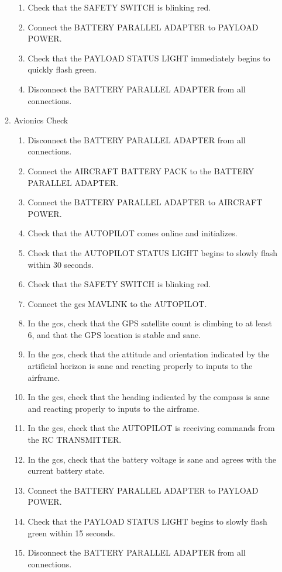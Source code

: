 \documentclass{report}
\begin{document}
\begin{enumerate}
\begin{enumerate}
\begin{enumerate}
							\item Check that the SAFETY SWITCH is blinking red.
							\item Connect the BATTERY PARALLEL ADAPTER to PAYLOAD POWER.
							\item Check that the PAYLOAD STATUS LIGHT immediately begins to quickly flash green.
							\item Disconnect the BATTERY PARALLEL ADAPTER from all connections.
						\end{enumerate}
					\item Avionics Check
						\begin{enumerate}
							\item Disconnect the BATTERY PARALLEL ADAPTER from all connections.
							\item Connect the AIRCRAFT BATTERY PACK to the BATTERY PARALLEL ADAPTER.
							\item Connect the BATTERY PARALLEL ADAPTER to AIRCRAFT POWER.
							\item Check that the AUTOPILOT comes online and initializes.
							\item Check that the AUTOPILOT STATUS LIGHT begins to slowly flash within 30 seconds.
							\item Check that the SAFETY SWITCH is blinking red.
							\item Connect the \gls{gcs} MAVLINK to the AUTOPILOT.
							\item In the \gls{gcs}, check that the GPS satellite count is climbing to at least 6, and that the GPS location is stable and sane.
							\item In the \gls{gcs}, check that the attitude and orientation indicated by the artificial horizon is sane and reacting properly to inputs to the airframe.
							\item In the \gls{gcs}, check that the heading indicated by the compass is sane and reacting properly to inputs to the airframe.
							\item In the \gls{gcs}, check that the AUTOPILOT is receiving commands from the RC TRANSMITTER.
							\item In the \gls{gcs}, check that the battery voltage is sane and agrees with the current battery state.
							\item Connect the BATTERY PARALLEL ADAPTER to PAYLOAD POWER.
							\item Check that the PAYLOAD STATUS LIGHT begins to slowly flash green within 15 seconds.
							\item Disconnect the BATTERY PARALLEL ADAPTER from all connections.

\end{enumerate}
\end{enumerate}
\end{enumerate}
\end{document}
